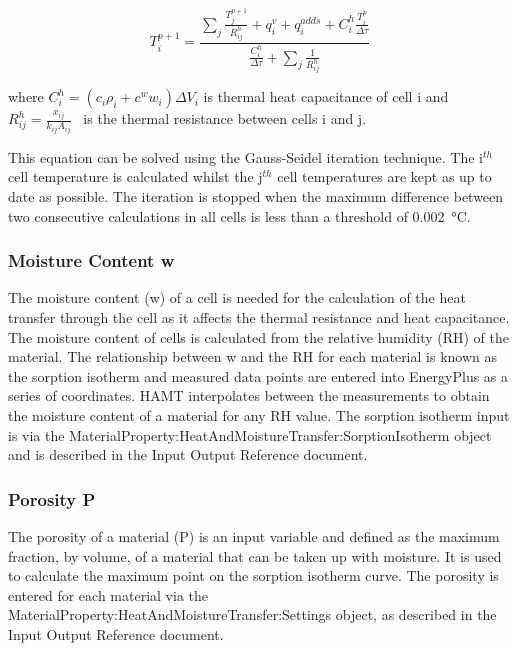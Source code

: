 \begin{equation}
T_i^{p + 1} = \frac{{\sum\nolimits_j {\frac{{T_j^{p + 1}}}{{R_{ij}^h}}}  + q_i^v + q_i^{adds} + C_i^h\frac{{T_i^p}}{{\Delta \tau }}}}{{\frac{{C_i^h}}{{\Delta \tau }} + \sum\nolimits_j {\frac{1}{{R_{ij}^h}}} }}
\label{eq:TemperatureIthCell}
\end{equation}

where \(C_i^h = \left( {{c_i}{\rho_i} + {c^w}{w_i}} \right)\Delta {V_i}\) is thermal heat capacitance of cell i and \(R_{ij}^h = \frac{x_{ij}}{k_{ij}A_{ij}}\) ~is the thermal resistance between cells i and j.

This equation can be solved using the Gauss-Seidel iteration technique. The
i\(^{th}\) cell temperature is calculated whilst the j\(^{th}\) cell
temperatures are kept as up to date as possible. The iteration is stopped
when the maximum difference between two consecutive calculations in all
cells is less than a threshold of \SI{0.002}{\celsius}.

\subsubsection{Moisture Content w}\label{moisture-content-w}

The moisture content (w) of a cell is needed for the calculation of the
heat transfer through the cell as it affects the thermal resistance and
heat capacitance. The moisture content of cells is calculated from the
relative humidity (RH) of the material. The relationship between w and the
RH for each material is known as the sorption isotherm and measured data
points are entered into EnergyPlus as a series of coordinates. HAMT
interpolates between the measurements to obtain the moisture content of a
material for any RH value. The sorption isotherm input is via the
MaterialProperty:HeatAndMoistureTransfer:SorptionIsotherm object and is
described in the Input Output Reference document.

\subsubsection{Porosity P}\label{porosity-p}

The porosity of a material (P) is an input variable and defined as the
maximum fraction, by volume, of a material that can be taken up with
moisture. It is used to calculate the maximum point on the sorption
isotherm curve. The porosity is entered for each material via the
MaterialProperty:HeatAndMoistureTransfer:Settings object, as described in
the Input Output Reference document.

